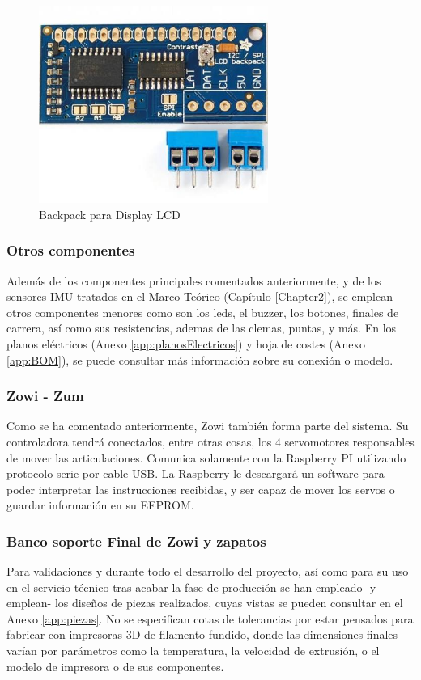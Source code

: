 \begin{figure}
\centering
\includegraphics[width=75mm]{Figures/backpack}
\caption{Backpack para Display LCD}
\label{fig:backpack}
\end{figure}

\subsubsection{Otros componentes}

Además de los componentes principales comentados anteriormente, y de los sensores IMU tratados en el Marco Teórico (Capítulo \ref{Chapter2}), se emplean otros componentes menores como son los leds, el buzzer, los botones, finales de carrera, así como sus resistencias, ademas de las clemas, puntas, y más. En los planos eléctricos (Anexo \ref{app:planosElectricos}) y hoja de costes (Anexo \ref{app:BOM}), se puede consultar más información sobre su conexión o modelo.

\subsubsection{Zowi - Zum}

Como se ha comentado anteriormente, Zowi también forma parte del sistema. Su controladora tendrá conectados, entre otras cosas, los 4 servomotores responsables de mover las articulaciones. Comunica solamente con la Raspberry PI utilizando protocolo serie por cable USB. La Raspberry le descargará un software para poder interpretar las instrucciones recibidas, y ser capaz de mover los servos o guardar información en su EEPROM.

\subsubsection{Banco soporte Final de Zowi y zapatos}

Para validaciones y durante todo el desarrollo del proyecto, así como para su uso en el servicio técnico tras acabar la fase de producción se han empleado -y emplean- los diseños de piezas realizados, cuyas vistas se pueden consultar en el Anexo \ref{app:piezas}. No se especifican cotas de tolerancias por estar pensados para fabricar con impresoras 3D de filamento fundido, donde las dimensiones finales varían por parámetros como la temperatura, la velocidad de extrusión, o el modelo de impresora o de sus componentes.


